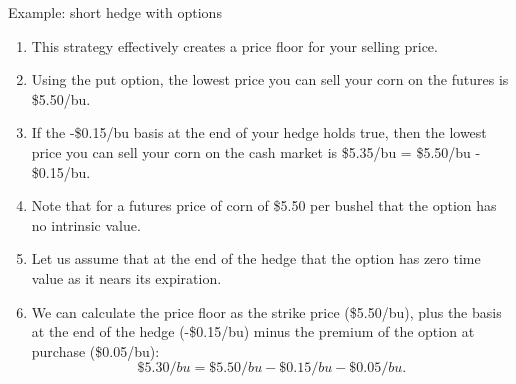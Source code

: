 \documentclass[table,xcolor=pdftex,dvipsnames, handout]{beamer}\usepackage[]{graphicx}\usepackage[]{color}
\begin{document}

\begin{frame}{Example: short hedge with options}
\begin{enumerate}[label=\textbullet]
  \item This strategy effectively creates a price floor for your selling price.
  \item Using the put option, the lowest price you can sell your corn on the futures is \$5.50/bu.
  \item If the -\$0.15/bu basis at the end of your hedge holds true, then the lowest price you can sell your corn on the cash market is \$5.35/bu = \$5.50/bu - \$0.15/bu.
  \item Note that for a futures price of corn of \$5.50 per bushel that the option has no intrinsic value.
  \item Let us assume that at the end of the hedge that the option has zero time value as it nears its expiration.
  \item We can calculate the price floor as the strike price (\$5.50/bu), plus the basis at the end of the hedge (-\$0.15/bu) minus the premium of the option at purchase (\$0.05/bu): \[\$5.30/bu = \$5.50/bu - \$0.15/bu - \$0.05/bu.\]
\end{enumerate}
\end{frame}

\end{document}

